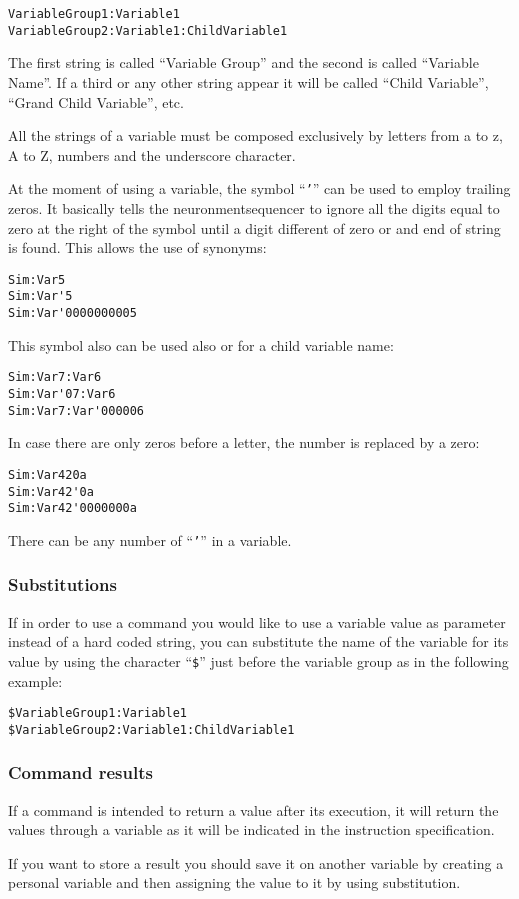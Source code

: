 \begin{verbatim}
VariableGroup1:Variable1
VariableGroup2:Variable1:ChildVariable1
\end{verbatim}

The first string is called ``Variable Group'' and the second is called ``Variable Name''. If a third or any other string appear it will be called ``Child Variable'', ``Grand Child Variable'', etc.

All the strings of a variable must be composed exclusively by letters from a to z, A to Z, numbers and the underscore character.

At the moment of using a variable, the symbol ``\texttt{'}'' can be used to employ trailing zeros. It basically tells the \gls{neuronmentsequencer} to ignore all the digits equal to zero at the right of the symbol until a digit different of zero or and end of string is found. This allows the use of synonyms:

\begin{verbatim}
Sim:Var5
Sim:Var'5
Sim:Var'0000000005
\end{verbatim}

This symbol also can be used also or for a child variable name:

\begin{verbatim}
Sim:Var7:Var6
Sim:Var'07:Var6
Sim:Var7:Var'000006
\end{verbatim}

In case there are only zeros before a letter, the number is replaced by a zero:

\begin{verbatim}
Sim:Var420a
Sim:Var42'0a
Sim:Var42'0000000a
\end{verbatim}

There can be any number of ``\texttt{'}'' in a variable.

\subsubsection{Substitutions}
If in order to use a command you would like to use a variable value as parameter instead of a hard coded string, you can substitute the name of the variable for its value by using the character ``\texttt{\$}'' just before the variable group as in the following example:\lotharpi

\begin{verbatim}
$VariableGroup1:Variable1
$VariableGroup2:Variable1:ChildVariable1
\end{verbatim}

\subsubsection{Command results}
If a command is intended to return a value after its execution, it will return the values through  a variable as it will be indicated in the instruction specification.

If you want to store a result you should save it on another variable by creating a personal variable and then assigning the value to it by using substitution.\lotharpi
